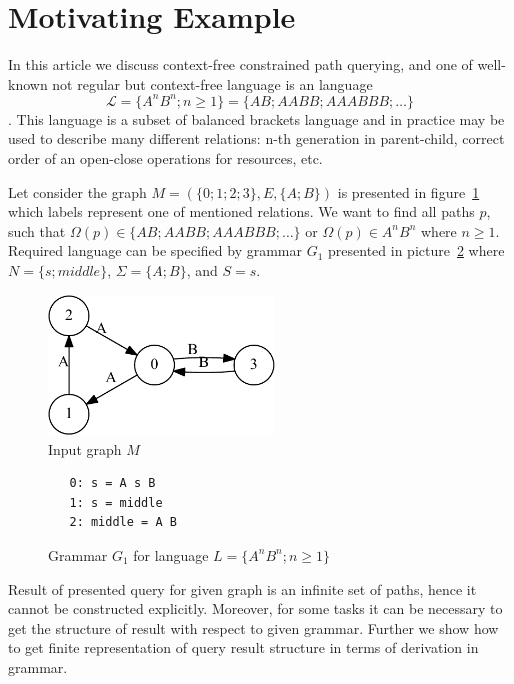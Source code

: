 \section{Motivating Example}\label{motivExample}

In this article we discuss context-free constrained path querying, and one of well-known not regular but context-free language is an 
language $$\mathcal{L} = \{A^n B^n; n \geq 1\} = \{AB; AABB; AAABBB; \dots\}$$.
This language is a subset of balanced brackets language and in practice may be used to describe many different relations: n-th generation in parent-child, correct order of an open-close operations for resources, etc.

Let consider the graph $M=(\{0;1;2;3\},E,\{A;B\})$ is presented in figure~\ref{input} which labels represent one of mentioned relations.
We want to find all paths $p$, such that $\Omega(p) \in \{AB; AABB; AAABBB; \dots\}$ or $\Omega(p) \in A^n B^n$ where $n \geq 1$.
Required language can be specified by grammar $G_1$ presented in picture~\ref{grammarG} where $N = \{s; middle\}$, $\Sigma = \{A; B\}$, and $S = s$.

\begin{figure}[h]
    \begin{center}
        \includegraphics[width=6cm]{dot/input.pdf}
        \caption{Input graph $M$}
        \label{input}        
    \end{center}
\end{figure}

\begin{figure}[h]
   \begin{center}
\begin{verbatim}
   0: s = A s B 
   1: s = middle
   2: middle = A B
\end{verbatim}
   \caption{Grammar $G_1$ for language $L=\{A^n B^n; n \geq 1\}$}
   \label{grammarG}        
   \end{center}
\end{figure}

Result of presented query for given graph is an infinite set of paths, hence it cannot be constructed explicitly. 
Moreover, for some tasks it can be necessary to get the structure of result with respect to given grammar.
Further we show how to get finite representation of query result structure in terms of derivation in grammar.
